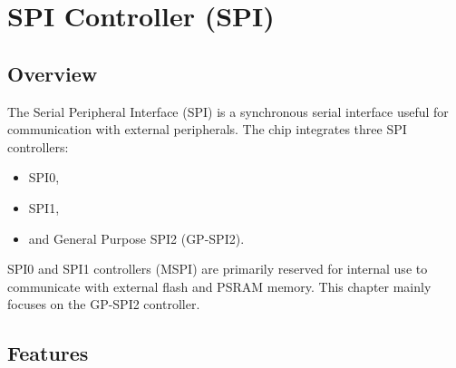 \documentclass[main\_\_EN.tex]{subfiles}
\begin{document}

\ifglobal
\else
    {\let\clearpage\relax \listoftodos}
    \tableofcontents
\fi


\hypertarget{spi}{}
\chapter{SPI Controller (SPI)}
\label{mod:spi}

\section{Overview}

The Serial Peripheral Interface (SPI) is a synchronous serial interface useful for communication with external peripherals. 
The \chipname{} chip integrates three SPI controllers: 
\begin{itemize}
  \item SPI0,
  \item SPI1,
  \item and General Purpose SPI2 (GP-SPI2).
\end{itemize}

SPI0 and SPI1 controllers (MSPI) are primarily reserved for internal use to communicate with external flash and PSRAM memory. This chapter mainly focuses on the GP-SPI2 controller. 



\section{Features}
\end{document}
